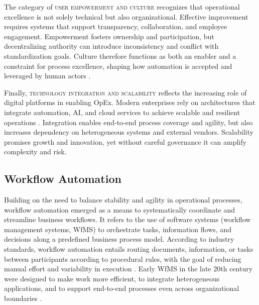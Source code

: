 The category of \textsc{user empowerment and culture} recognizes that operational excellence is not solely technical but also organizational. Effective improvement requires systems that support transparency, collaboration, and employee engagement. Empowerment fosters ownership and participation, but decentralizing authority can introduce inconsistency and conflict with standardization goals. Culture therefore functions as both an enabler and a constraint for process excellence, shaping how automation is accepted and leveraged by human actors \parencite[cf.][p. 15.2-3]{juranQuality1999} \parencite[cf.][p.3]{womackLean1997}.

Finally, \textsc{technology integration and scalability} reflects the increasing role of digital platforms in enabling OpEx. Modern enterprises rely on architectures that integrate automation, AI, and cloud services to achieve scalable and resilient operations \parencite{owoadeSystematic2024}. Integration enables end-to-end process coverage and agility, but also increases dependency on heterogeneous systems and external vendors. Scalability promises growth and innovation, yet without careful governance it can amplify complexity and risk.

\subsection{Workflow Automation}\label{subsec:workflow-auto}
Building on the need to balance stability and agility in operational processes, workflow automation emerged as a means to systematically coordinate and streamline business workflows. It refers to the use of software systems (workflow management systems, WfMS) to orchestrate tasks, information flows, and decisions along a predefined business process model. According to industry standards, workflow automation entails routing documents, information, or tasks between participants according to procedural rules, with the goal of reducing manual effort and variability in execution \parencite[cf.][p. 2]{basuResearch2002}. Early WfMS in the late 20th century were designed to make work more efficient, to integrate heterogeneous applications, and to support end-to-end processes even across organizational boundaries \parencite[cf.][p. 281]{stohrWorkflow2001}.

